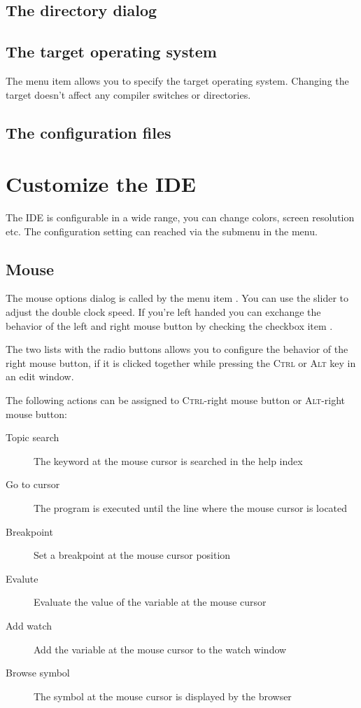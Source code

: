 \subsection{The directory dialog}

\subsection{The target operating system}
The menu item  allows you to specify the target
operating system. Changing the target doesn't affect any compiler
switches or directories.

\subsection{The configuration files}

\section{Customize the IDE}
The IDE is configurable in a wide range, you can change colors, screen
resolution etc. The configuration setting can reached via the
submenu  in the  menu.

\subsection{Mouse}
\label{ide:prefmouse}
The mouse options dialog is called by the menu item
. You can use the slider to adjust the
double clock speed. If you're left handed you can exchange the
behavior of the left and right mouse button by checking the checkbox
item .

The two lists with the radio buttons allows you
to configure the behavior of the
right mouse button, if it is clicked together while
pressing the \textsc{Ctrl} or
\textsc{Alt} key in an edit window.

The following actions can be assigned to \textsc{Ctrl}-right mouse button or
\textsc{Alt}-right mouse button:

\begin{description}
\item [Topic search] The keyword at the mouse cursor is searched in the
help index
\item [Go to cursor] The program is executed until the line where
the mouse cursor is located
\item [Breakpoint] Set a breakpoint at the mouse cursor position
\item [Evalute] Evaluate the value of the variable at the mouse
cursor
\item [Add watch] Add the variable at the mouse cursor to the
watch window
\item [Browse symbol] The symbol at the mouse cursor is displayed
by the browser
\end{description}



